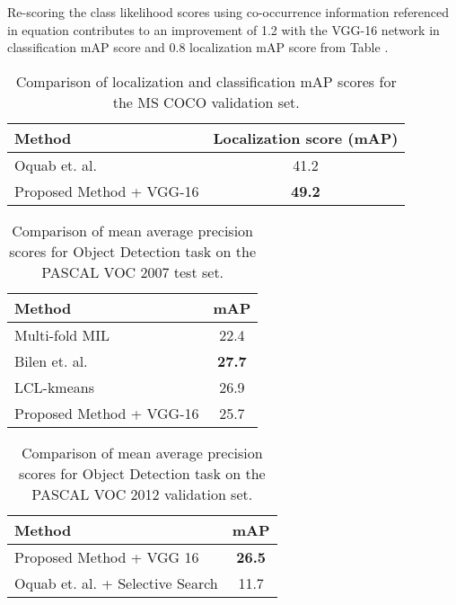 \documentclass[runningheads]{llncs}
\begin{document}
Re-scoring the class likelihood scores using co-occurrence information referenced in equation  contributes to an improvement of 1.2 with the VGG-16 network in classification mAP score and 0.8 localization mAP score from Table .


\begin{table}[]
\small
\centering
\begin{tabular}{|l|c|}
\hline
\textbf{Method} & \multicolumn{1}{l|}{Localization score (mAP)} \\ \hline
Oquab et. al. \cite{oquabobject} & 41.2 \\ \hline
Proposed Method + VGG-16 & \textbf{49.2} \\ \hline
\end{tabular}
\caption{Comparison of localization and classification mAP scores for the MS COCO validation set.}
\label{table:localizationMSCOCO}
\end{table}



\begin{table}[]
\footnotesize
\setlength{\tabcolsep}{2pt}
\centering
\begin{tabular}{|l|c|}
\hline
\textbf{Method}                         & \multicolumn{1}{l|}{\textbf{mAP}} \\ \hline
Multi-fold MIL \cite{cinbis2014multi} & 22.4                                   \\ \hline
Bilen et. al. \cite{bilen2015weakly}  & \textbf{27.7}                                   \\ \hline
LCL-kmeans \cite{wang2014weakly}      & 26.9                                   \\ \hline
Proposed Method + VGG-16                & 25.7                                   \\ \hline
\end{tabular}
\caption{Comparison of mean average precision scores for Object Detection task on the PASCAL VOC 2007 test set.}
\label{table:detectionscores}
\end{table}


\begin{table}[]
\centering

\label{my-label}
\begin{tabular}{|l|c|}
\hline
\textbf{Method}                                                     & \multicolumn{1}{l|}{\textbf{mAP}} \\ \hline
Proposed Method + VGG 16                                            & \textbf{26.5}                     \\ \hline
Oquab et. al. \cite{oquabobject} + Selective Search \cite{uijlings2013selective} & 11.7                              \\ \hline
\end{tabular}
\caption{Comparison of mean average precision scores for Object Detection
task on the PASCAL VOC 2012 validation set.}
\label{table:2012detectionscores}
\end{table}
\end{document}
